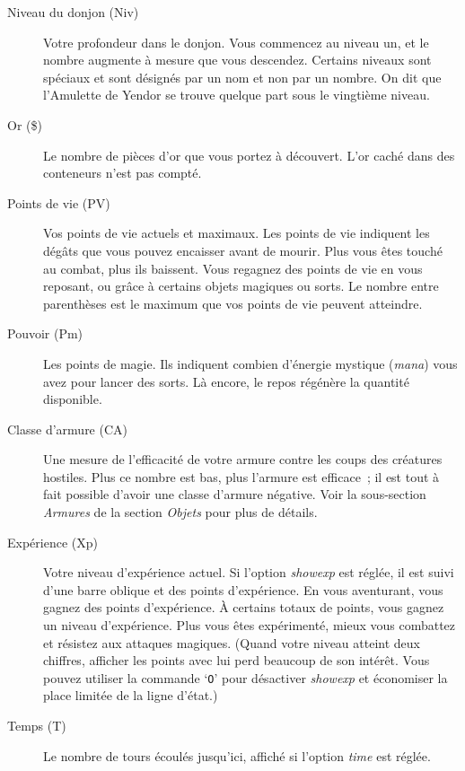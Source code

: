 \documentclass[titlepage]{article}
\begin{document}
\begin{description}
\item[{Niveau du donjon (Niv)}]
Votre profondeur dans le donjon.
Vous commencez au niveau un, et le nombre augmente à mesure que vous
descendez.
Certains niveaux sont spéciaux et sont désignés par un nom et non par un
nombre.
On dit que l'Amulette de Yendor se trouve quelque part sous le vingtième
niveau.

\item[{Or (\$)}]
Le nombre de pièces d'or que vous portez à découvert.
L'or caché dans des conteneurs n'est pas compté.

\item[{Points de vie (PV)}]
Vos points de vie actuels et maximaux.
Les points de vie indiquent les dégâts que vous pouvez encaisser avant de
mourir.
Plus vous êtes touché au combat, plus ils baissent.
Vous regagnez des points de vie en vous reposant, ou grâce à certains
objets magiques ou sorts.
Le nombre entre parenthèses est le maximum que vos points de vie peuvent
atteindre.

\item[{Pouvoir (Pm)}]
Les points de magie.
Ils indiquent combien d'énergie mystique (\textit{mana}) vous avez pour lancer
des sorts.
Là encore, le repos régénère la quantité disponible.

\item[{Classe d'armure (CA)}]
Une mesure de l'efficacité de votre armure contre les coups des créatures
hostiles.
Plus ce nombre est bas, plus l'armure est efficace~; il est tout à fait
possible d'avoir une classe d'armure négative.
Voir la sous-section \textit{Armures} de la section \textit{Objets} pour plus de
détails.

\item[{Expérience (Xp)}]
Votre niveau d'expérience actuel.
Si l'option
\textit{showexp}
est réglée, il est suivi d'une barre oblique et des points d'expérience.
En vous aventurant, vous gagnez des points d'expérience.
À certains totaux de points, vous gagnez un niveau d'expérience.
Plus vous êtes expérimenté, mieux vous combattez et résistez aux attaques
magiques.
(Quand votre niveau atteint deux chiffres, afficher les points avec lui
perd beaucoup de son intérêt.
Vous pouvez utiliser la commande `\texttt{O}' pour désactiver
\textit{showexp}
et économiser la place limitée de la ligne d'état.)

\item[{Temps (T)}]
Le nombre de tours écoulés jusqu'ici, affiché si l'option
\textit{time}
est réglée.


\end{description}
\end{document}
